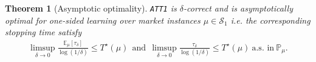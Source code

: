 \documentclass{article}
\newcommand{\E}{\mathbb{E}}
\newtheorem{theorem}{Theorem}
\newtheorem{lemma}[theorem]{Lemma}
\begin{document}
\begin{theorem}[Asymptotic optimality]\label{thm:one_sided_assymp_opt}
    \texttt{ATT1} is $\delta$-correct and is asymptotically optimal for one-sided learning over market instances $\mu\in \mathcal{S}_{1}$ i.e. the corresponding stopping time satisfy 
\begin{align*}
    \limsup_{\delta\to 0}\frac{\E_{\mu}[\tau_{\delta}]}{\log(1/\delta)}\leq T^{\star}(\mu) \ \ \text{and}\ \ \limsup_{\delta\to 0}\frac{\tau_{\delta}}{\log(1/\delta)}\leq T^{\star}(\mu)\ \text{a.s. in}\ \mathbb{P}_\mu.
\end{align*}


\end{theorem}
\end{document}
